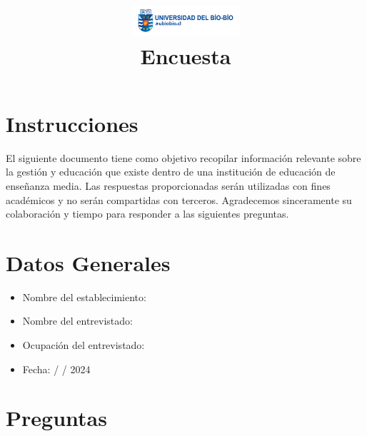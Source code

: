 \documentclass{article}
\title{
    \vspace{-2cm}
    \includegraphics[width=4cm]{img/logo-ubb-txt-face.png}\\[0cm] %
    \textbf{Encuesta}
    \vspace{-1.5cm}
}
\author{}
\date{}
\begin{document}
\maketitle

\section*{Instrucciones}
El siguiente documento tiene como objetivo recopilar información relevante sobre la gestión y educación que existe dentro de una institución de educación de enseñanza media. Las respuestas proporcionadas serán utilizadas con fines académicos y no serán compartidas con terceros. Agradecemos sinceramente su colaboración y tiempo para responder a las siguientes preguntas.

\section*{Datos Generales}
\begin{itemize}
    \item Nombre del establecimiento: \underline{\hspace{0.6\linewidth}}
    \item Nombre del entrevistado: \underline{\hspace{0.63\linewidth}}
    \item Ocupación del entrevistado: \underline{\hspace{0.6021\linewidth}}
    \item Fecha: \hspace*{0.5cm} / \hspace*{0.5cm} / 2024
\end{itemize}

\section*{Preguntas}
\end{document}
